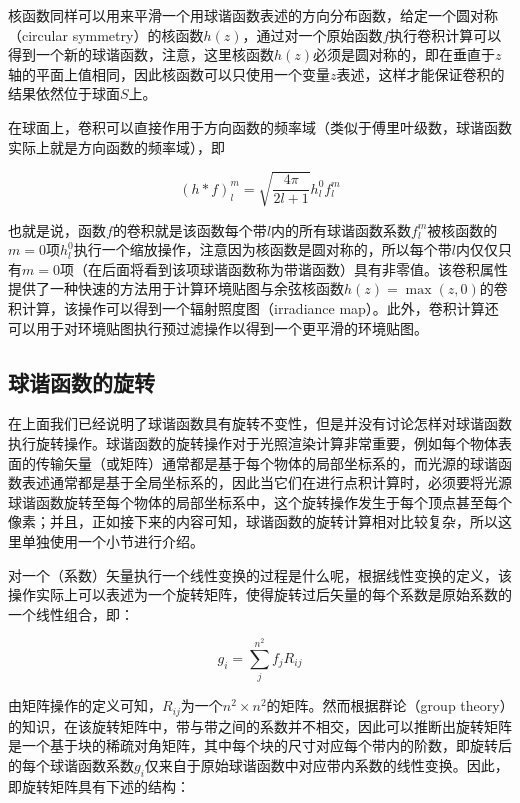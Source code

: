 核函数同样可以用来平滑一个用球谐函数表述的方向分布函数，给定一个圆对称（circular symmetry）的核函数$h(z)$，通过对一个原始函数$f$执行卷积计算可以得到一个新的球谐函数，注意，这里核函数$h(z)$必须是圆对称的，即在垂直于$z$轴的平面上值相同，因此核函数可以只使用一个变量$z$表述，这样才能保证卷积的结果依然位于球面$S$上。

在球面上，卷积可以直接作用于方向函数的频率域（类似于傅里叶级数，球谐函数实际上就是方向函数的频率域），即

\begin{equation}\label{e:pl-sh-convolution}
	(h*f)^{m}_{l}=\sqrt{\frac{4\pi}{2l+1}}h^{0}_{l}f^{m}_{l}
\end{equation} 

也就是说，函数$f$的卷积就是该函数每个带$l$内的所有球谐函数系数$f^{m}_l$被核函数的$m=0$项$h^{0}_l$执行一个缩放操作，注意因为核函数是圆对称的，所以每个带$l$内仅仅只有$m=0$项（在后面将看到该项球谐函数称为带谐函数）具有非零值。该卷积属性提供了一种快速的方法用于计算环境贴图与余弦核函数$h(z) = \max(z,0)$的卷积计算，该操作可以得到一个辐射照度图（irradiance map）。此外，卷积计算还可以用于对环境贴图执行预过滤操作以得到一个更平滑的环境贴图。
	
	

\subsection{球谐函数的旋转}\label{sec:pl-rotation}
在上面我们已经说明了球谐函数具有旋转不变性，但是并没有讨论怎样对球谐函数执行旋转操作。球谐函数的旋转操作对于光照渲染计算非常重要，例如每个物体表面的传输矢量（或矩阵）通常都是基于每个物体的局部坐标系的，而光源的球谐函数表述通常都是基于全局坐标系的，因此当它们在进行点积计算时，必须要将光源球谐函数旋转至每个物体的局部坐标系中，这个旋转操作发生于每个顶点甚至每个像素；并且，正如接下来的内容可知，球谐函数的旋转计算相对比较复杂，所以这里单独使用一个小节进行介绍。

对一个（系数）矢量执行一个线性变换的过程是什么呢，根据线性变换的定义，该操作实际上可以表述为一个旋转矩阵，使得旋转过后矢量的每个系数是原始系数的一个线性组合，即：

\begin{equation}\label{e:pl-linear-transform}
	g_i=\sum^{n^{2}}_j f_j R_{ij}
\end{equation}

由矩阵操作的定义可知，$R_{ij}$为一个$n^{2}\times n^{2}$的矩阵。然而根据群论（group theory）的知识，在该旋转矩阵中，带与带之间的系数并不相交，因此可以推断出旋转矩阵是一个基于块的稀疏对角矩阵，其中每个块的尺寸对应每个带内的阶数，即旋转后的每个球谐函数系数$g_i$仅来自于原始球谐函数中对应带内系数的线性变换。因此，即旋转矩阵具有下述的结构：

